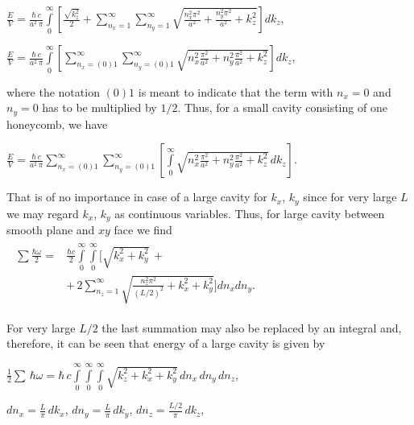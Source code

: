 \documentclass[twoside, 10pt, ptm]{article}
\begin{document}
\begin{multicols}{2}
\noindent
\(\frac{E}{V} = \frac{\hbar\,c}{a^2\,\pi}\int\limits_{0}^{\infty}\left[{\frac{\sqrt{k_z^2}}{2}+\sum\limits_{n_x=1}^{\infty}\sum\limits_{n_y=1}^{\infty}\sqrt{\frac{n_x^2 \pi^2}{a^2}+\frac{n_y^2 \pi^2}{a^2}+k_z^2}}\right] dk_z\),

\noindent
\(\frac{E}{V} = \frac{\hbar\,c}{a^2\,\pi}\int\limits_{0}^{\infty}\left[{\sum\limits_{n_x=(0)1}^{\infty}\sum\limits_{n_y=(0)1}^{\infty}\sqrt{n_x^2\frac{\pi^2}{a^2}+n_y^2\frac{\pi^2}{a^2}+k_z^2}}\right] dk_z\),

    where the notation \(\left(0\right) 1\) is meant to indicate that the
term with \(n_x = 0\) and \(n_y = 0\) has to be multiplied by
\(1\big/2\). Thus, for a small cavity consisting of one honeycomb, we have

    \(\frac{E}{V} = \frac{\hbar\,c}{a^2\,\pi}\sum\limits_{n_x=(0)1}^{\infty}\sum\limits_{n_y=(0)1}^{\infty}\left[\int\limits_{0}^{\infty}\sqrt{n_x^2\frac{\pi^2}{a^2}+n_y^2\frac{\pi^2}{a^2}+k_z^2}\,dk_z\right]\).

    That is of no importance in case of a large cavity for \(k_x\), \(k_y\)
since for very large \(L\) we may regard \(k_x\), \(k_y\) as
continuous variables. Thus, for large cavity between smooth plane and \(xy\) face we find
\noindent
\(\begin{array}{c}
\begin{array}{ll}
    \sum\frac{\hbar\omega}{2} = & \frac{\hbar c}{2}\int\limits_{0}^{\infty}\int\limits_{0}^{\infty}\Bigg[\sqrt{k_x^2+k_y^2}\,+ \\
   & +\,2\sum\limits_{n_z=1}^{\infty}\sqrt{\frac{n_z^2 \pi^2}{(L/2)^2}+k_x^2+k_y^2}\Bigg]d{n_x}d{n_y}.
\end{array}
\end{array}\)


    For very large \(L/2\) the last summation may also be replaced by an
integral and, therefore, it can be seen that energy of a large cavity is given by

    \(\frac{1}{2}\sum\,\hbar\omega = \hbar\,c\int\limits_{0}^{\infty}\int\limits_{0}^{\infty}\int\limits_{0}^{\infty}\sqrt{k_z^2+k_x^2+k_y^2}\,d{n_x}\,d{n_y}\,d{n_z}\),

    \(dn_x = \frac{L}{\pi}\,dk_x\), \(dn_y = \frac{L}{\pi}\,dk_y\),
\(dn_z = \frac{L/2}{\pi}\,dk_z\),


\end{multicols}
\end{document}
